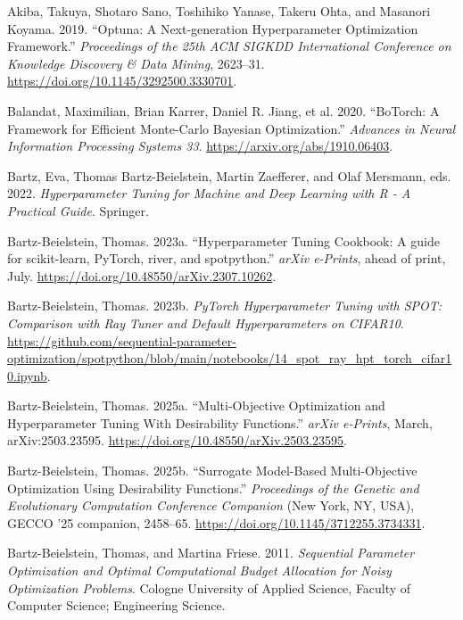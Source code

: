 \documentclass[
  twocolumn]{article}
\newlength{\cslhangindent}
\newenvironment{CSLReferences}[2] %
 {\begin{list}{}{%
  \setlength{\itemindent}{0pt}
  \setlength{\leftmargin}{0pt}
  \setlength{\parsep}{0pt}
  \ifodd #1
   \setlength{\leftmargin}{\cslhangindent}
   \setlength{\itemindent}{-1\cslhangindent}
  \fi
  \setlength{\itemsep}{#2\baselineskip}}}
 {\end{list}}
\begin{document}
\protect{}\label{refs}
\begin{CSLReferences}{1}{1}
Akiba, Takuya, Shotaro Sano, Toshihiko Yanase, Takeru Ohta, and Masanori
Koyama. 2019. {``{Optuna: A Next-generation Hyperparameter Optimization
Framework}.''} \emph{Proceedings of the 25th ACM SIGKDD International
Conference on Knowledge Discovery \& Data Mining}, 2623--31.
\url{https://doi.org/10.1145/3292500.3330701}.

Balandat, Maximilian, Brian Karrer, Daniel R. Jiang, et al. 2020.
{``{BoTorch: A Framework for Efficient Monte-Carlo Bayesian
Optimization}.''} \emph{Advances in Neural Information Processing
Systems 33}. \url{https://arxiv.org/abs/1910.06403}.

Bartz, Eva, Thomas Bartz-Beielstein, Martin Zaefferer, and Olaf
Mersmann, eds. 2022. \emph{{Hyperparameter Tuning for Machine and Deep
Learning with R - A Practical Guide}}. Springer.

Bartz-Beielstein, Thomas. 2023a. {``{Hyperparameter Tuning Cookbook: A
guide for scikit-learn, PyTorch, river, and spotpython}.''} \emph{arXiv
e-Prints}, ahead of print, July.
\url{https://doi.org/10.48550/arXiv.2307.10262}.

Bartz-Beielstein, Thomas. 2023b. \emph{{PyTorch} Hyperparameter Tuning
with {SPOT}: Comparison with {Ray Tuner} and Default Hyperparameters on
{CIFAR10}}.
\url{https://github.com/sequential-parameter-optimization/spotpython/blob/main/notebooks/14_spot_ray_hpt_torch_cifar10.ipynb}.

Bartz-Beielstein, Thomas. 2025a. {``{Multi-Objective Optimization and
Hyperparameter Tuning With Desirability Functions}.''} \emph{arXiv
e-Prints}, March, arXiv:2503.23595.
\url{https://doi.org/10.48550/arXiv.2503.23595}.

Bartz-Beielstein, Thomas. 2025b. {``Surrogate Model-Based
Multi-Objective Optimization Using Desirability Functions.''}
\emph{Proceedings of the Genetic and Evolutionary Computation Conference
Companion} (New York, NY, USA), GECCO '25 companion, 2458--65.
\url{https://doi.org/10.1145/3712255.3734331}.

Bartz-Beielstein, Thomas, and Martina Friese. 2011. \emph{{Sequential
Parameter Optimization and Optimal Computational Budget Allocation for
Noisy Optimization Problems}}. Cologne University of Applied Science,
Faculty of Computer Science; Engineering Science.


\end{CSLReferences}
\end{document}

